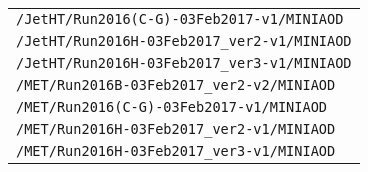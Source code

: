 \begin{table}[ht!]
\begin{center}
\begin{tabular}{ l}
        \texttt{/JetHT/Run2016(C-G)-03Feb2017-v1/MINIAOD}   \\
        \texttt{/JetHT/Run2016H-03Feb2017\_ver2-v1/MINIAOD}    \\
        \texttt{/JetHT/Run2016H-03Feb2017\_ver3-v1/MINIAOD}   \\     
        \texttt{/MET/Run2016B-03Feb2017\_ver2-v2/MINIAOD}   \\
        \texttt{/MET/Run2016(C-G)-03Feb2017-v1/MINIAOD}   \\
        \texttt{/MET/Run2016H-03Feb2017\_ver2-v1/MINIAOD}    \\
        \texttt{/MET/Run2016H-03Feb2017\_ver3-v1/MINIAOD}   \\     
\hline\hline
\end{tabular}
\end{center}
\end{table}                                                                                  
